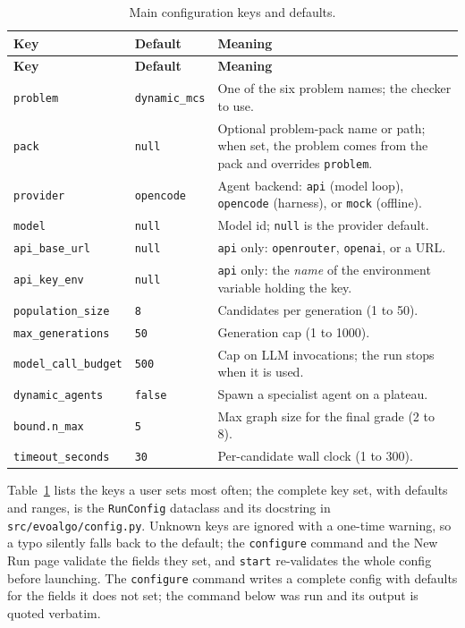 \begin{center}
\footnotesize
\setlength{\tabcolsep}{5pt}
\begin{longtable}{@{}p{}p{}p{}@{}}
\caption{Main configuration keys and defaults.}\label{tab:ud-config}\\
\toprule
\textbf{Key} & \textbf{Default} & \textbf{Meaning} \\
\midrule
\endfirsthead
\toprule
\textbf{Key} & \textbf{Default} & \textbf{Meaning} \\
\midrule
\endhead
\bottomrule
\endfoot
\texttt{problem} & \texttt{dynamic\_mcs} & One of the six problem names; the checker to use. \\
\texttt{pack} & \texttt{null} & Optional problem-pack name or path; when set, the problem comes from the pack and overrides \texttt{problem}. \\
\texttt{provider} & \texttt{opencode} & Agent backend: \texttt{api} (model loop), \texttt{opencode} (harness), or \texttt{mock} (offline). \\
\texttt{model} & \texttt{null} & Model id; \texttt{null} is the provider default. \\
\texttt{api\_base\_url} & \texttt{null} & \texttt{api} only: \texttt{openrouter}, \texttt{openai}, or a URL. \\
\texttt{api\_key\_env} & \texttt{null} & \texttt{api} only: the \emph{name} of the environment variable holding the key. \\
\texttt{population\_size} & \texttt{8} & Candidates per generation (1 to 50). \\
\texttt{max\_generations} & \texttt{50} & Generation cap (1 to 1000). \\
\texttt{model\_call\_budget} & \texttt{500} & Cap on LLM invocations; the run stops when it is used. \\
\texttt{dynamic\_agents} & \texttt{false} & Spawn a specialist agent on a plateau. \\
\texttt{bound.n\_max} & \texttt{5} & Max graph size for the final grade (2 to 8). \\
\texttt{timeout\_seconds} & \texttt{30} & Per-candidate wall clock (1 to 300). \\
\bottomrule
\end{longtable}
\end{center}

Table~\ref{tab:ud-config} lists the keys a user sets most often; the complete
key set, with defaults and ranges, is the \texttt{RunConfig} dataclass and its
docstring in \texttt{src/evoalgo/config.py}. Unknown keys are ignored with a
one-time warning, so a typo silently falls back to the default; the
\texttt{configure} command and the New Run page validate the fields they set,
and \texttt{start} re-validates the whole config before launching. The
\texttt{configure} command writes a complete config with defaults for the
fields it does not set; the command below was run and its output is quoted
verbatim.

